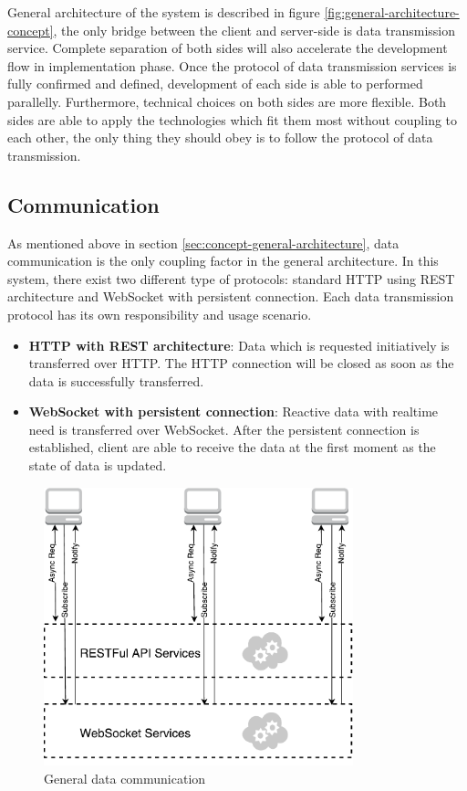 General architecture of the system is described in figure \ref{fig:general-architecture-concept}, the only bridge between the client and server-side is data transmission service. Complete separation of both sides will also accelerate the development flow in implementation phase. Once the protocol of data transmission services is fully confirmed and defined, development of each side is able to performed parallelly. Furthermore, technical choices on both sides are more flexible. Both sides are able to apply the technologies which fit them most without coupling to each other, the only thing they should obey is to follow the protocol of data transmission.

\subsection{Communication} \label{subsection:concept-general-communication}
As mentioned above in section \ref{sec:concept-general-architecture}, data communication is the only coupling factor in the general architecture. In this system, there exist two different type of protocols: standard HTTP using REST architecture and WebSocket with persistent connection. Each data transmission protocol has its own responsibility and usage scenario.

\begin{itemize}
\item
\textbf{HTTP with REST architecture}: Data which is requested initiatively is transferred over HTTP. The HTTP connection will be closed as soon as the data is successfully transferred.
\item
\textbf{WebSocket with persistent connection}: Reactive data with realtime need is transferred over WebSocket. After the persistent connection is established, client are able to receive the data at the first moment as the state of data is updated. 
\end{itemize}

\begin{figure}[!htbp]
  \centering
    \includegraphics[width=0.8\textwidth]{Figures/concept-general-data-communication.pdf}
  \caption{General data communication}
  \label{fig:general-data-communication-concept}
\end{figure}

